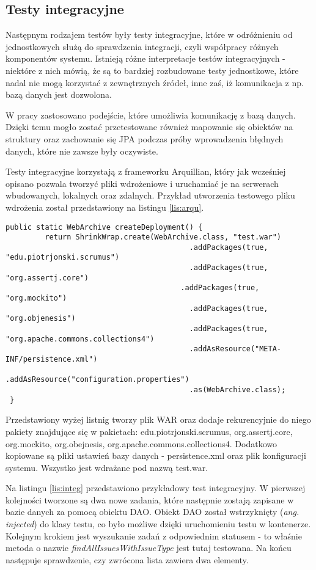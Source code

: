 \subsection{Testy integracyjne}
Następnym rodzajem testów były testy integracyjne, które w odróżnieniu od jednostkowych służą do sprawdzenia integracji, czyli współpracy różnych komponentów systemu. Istnieją różne interpretacje testów integracyjnych - niektóre z nich mówią, że są to bardziej rozbudowane testy jednostkowe, które nadal nie mogą korzystać z zewnętrznych źródeł, inne zaś, iż komunikacja z np. bazą danych jest dozwolona. 

W pracy zastosowano podejście, które umożliwia komunikację z bazą danych. Dzięki temu mogło zostać przetestowane również mapowanie się obiektów na struktury oraz zachowanie się JPA podczas próby wprowadzenia błędnych danych, które nie zawsze były oczywiste.

Testy integracyjne korzystają z frameworku Arquillian, który jak wcześniej opisano pozwala tworzyć pliki wdrożeniowe i uruchamiać je na serwerach wbudowanych, lokalnych oraz zdalnych. Przykład utworzenia testowego pliku wdrożenia został przedstawiony na listingu \ref{lis:arqu}.

\begin{lstlisting}[caption={Przykład przygotowania pliku wdrożenia Arquillian}, label=lis:arqu, numbers=none]
 public static WebArchive createDeployment() {
		 return ShrinkWrap.create(WebArchive.class, "test.war")
										  .addPackages(true, "edu.piotrjonski.scrumus")
										  .addPackages(true, "org.assertj.core")
									   	.addPackages(true, "org.mockito")
										  .addPackages(true, "org.objenesis")
										  .addPackages(true, "org.apache.commons.collections4")
										  .addAsResource("META-INF/persistence.xml")
										  .addAsResource("configuration.properties")
										  .as(WebArchive.class);
 }\end{lstlisting}

Przedstawiony wyżej listnig tworzy plik WAR oraz dodaje rekurencyjnie do niego pakiety znajdujące się w pakietach: edu.piotrjonski.scrumus, org.assertj.core, org.mockito, org.obejnesis, org.apache.commons.collections4. Dodatkowo kopiowane są pliki ustawień bazy danych - persistence.xml oraz plik konfiguracji systemu. Wszystko jest wdrażane pod nazwą test.war.

Na listingu \ref{lis:integ} przedstawiono przykładowy test integracyjny. W pierwszej kolejności tworzone są dwa nowe zadania, które następnie zostają zapisane w bazie danych za pomocą obiektu DAO. Obiekt DAO został wstrzyknięty (\textit{ang. injected}) do klasy testu, co było możliwe dzięki uruchomieniu testu w kontenerze. Kolejnym krokiem jest wyszukanie zadań z odpowiednim statusem - to właśnie metoda o nazwie \textit{findAllIssuesWithIssueType} jest tutaj testowana. Na końcu następuje sprawdzenie, czy zwrócona lista zawiera dwa elementy.

